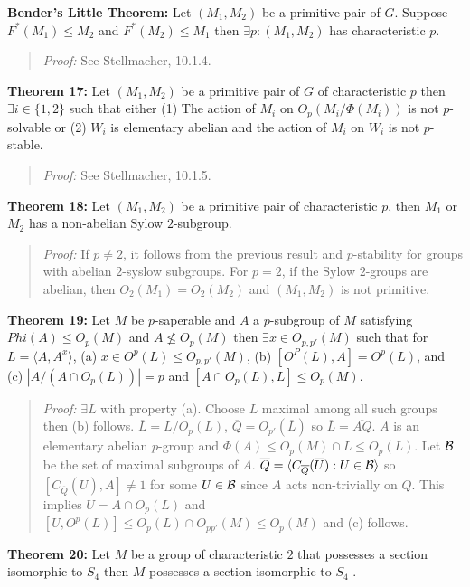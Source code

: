 {\bf Bender's Little Theorem:}
Let $(M_1, M_2)$ be a primitive pair of $G$.  Suppose $F^*(M_1) \le M_2$ and
$F^*(M_2) \le M_1$ then $\exists p: (M_1, M_2)$ has characteristic $p$.
\begin{quote}
\emph{Proof:}  See Stellmacher, 10.1.4.
\end{quote}
{\bf Theorem 17:}
Let $(M_1, M_2)$ be a primitive pair of $G$ of characteristic $p$ then $\exists i \in \{1 , 2 \}$
such that either (1) The action of $M_i$ on $O_p(M_i/ \Phi(M_i))$ is not $p$-solvable or
(2) $W_i$ is elementary abelian and the action of $M_i$ on $W_i$ is not $p$-stable.
\begin{quote}
\emph{Proof:}  See Stellmacher, 10.1.5.
\end{quote}
{\bf Theorem 18:}
Let $(M_1, M_2)$ be a primitive pair of characteristic $p$, then $M_1$ or
$M_2$ has a non-abelian Sylow $2$-subgroup.
\begin{quote}
\emph{Proof:}  If $p \neq 2$, it follows from the previous result and $p$-stability for groups with abelian $2$-syslow subgroups.
For $p= 2$, if the Sylow $2$-groups are abelian, then $O_2(M_1)= O_2(M_2)$ and $(M_1, M_2)$ is not primitive.
\end{quote}
{\bf Theorem 19:}
Let $M$ be $p$-saperable and $A$ a $p$-subgroup of $M$ satisfying
$Phi(A) \leq O_p(M)$ and $A \nleq O_p(M)$ then $\exists x \in O_{p,p'}(M)$
such that for $L= \langle A, A^x \rangle$, (a) $x \in O^p(L) \leq O_{p,p'}(M)$,
(b) $[O^P(L),A]= O^p(L)$, and (c) $|A/(A \cap O_p(L))|=p$ and $[A \cap O_p(L), L] \leq O_p(M)$.
\begin{quote}
\emph{Proof:}  $\exists L$ with property (a).  Choose $L$ maximal among all such groups then (b) follows.
${\overline L}= L/O_p(L)$, ${\overline Q}= O_{p'}({\overline L})$ so ${\overline L} = {\overline {AQ}}$.
$A$ is an elementary abelian $p$-group and
$\Phi(A) \leq O_p(M) \cap L \leq O_p(L)$.  Let ${\cal B}$ be the set of maximal subgroups of $A$.
${\overline Q}=  \langle C_{\overline Q}({\overline U}): U \in {\cal B} \rangle$ so
$[C_{\overline Q}({\overline U}), A] \neq 1$ for some $U \in {\cal B}$ since $A$ acts non-trivially
on ${\overline Q}$.  This implies $U= A \cap O_p(L)$ and
$[U, O^p(L)] \leq O_p(L) \cap O_{pp'}(M) \leq O_p(M)$ and (c) follows.
\end{quote}
{\bf Theorem 20:}
Let $M$ be a group of characteristic $2$ that possesses a section isomorphic to $S_4$  then $M$
possesses a section isomorphic to $S_4$ .
